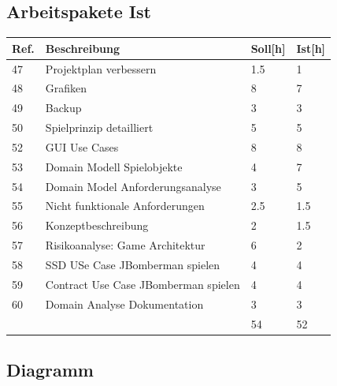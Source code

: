 \documentclass[11pt]{scrartcl}
\begin{document}
  \subsection{Arbeitspakete Ist}
  \begin{tabularx} {\linewidth}{lXll}
    \bf{Ref.}  & \bf{Beschreibung} & \bf{Soll[h]}  & \bf{Ist[h]}\\
    \hline
    47 & Projektplan verbessern & 1.5 & 1\\
    48 & Grafiken & 8 & 7\\
    49 &  Backup & 3 & 3\\
    50 & Spielprinzip detailliert & 5 & 5\\
    52 &  GUI Use Cases & 8 & 8\\
    53 & Domain Modell Spielobjekte & 4 & 7\\
    54 & Domain Model Anforderungsanalyse & 3 & 5\\
    55 & Nicht funktionale Anforderungen & 2.5 & 1.5\\
    56 & Konzeptbeschreibung & 2 & 1.5\\
    57 & Risikoanalyse: Game Architektur  & 6 & 2\\
    58 & SSD USe Case JBomberman spielen & 4 & 4\\
    59 & Contract Use Case JBomberman spielen & 4 & 4\\
    60 & 	Domain Analyse Dokumentation & 3 & 3 \\
    \hline
    & & 54 & 52
    \end{tabularx}

\subsection{Diagramm}
\end{document}
